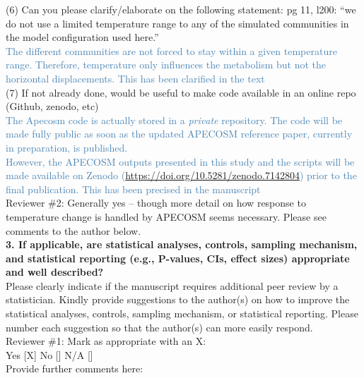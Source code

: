 \documentclass[12pt]{article}
\newcommand{\resp}[1]{\textcolor{SteelBlue}{#1}}
\begin{document}
(6) Can you please clarify/elaborate on the following statement: pg 11, l200: “we do not use a limited temperature range to any of the simulated communities in the model configuration used here.” \\


\resp{The different communities are not forced to stay within a given temperature range. Therefore, temperature
only influences the metabolism but not the horizontal displacements. This has been clarified in the text} \\

(7) If not already done, would be useful to make code available in an online repo (Github, zenodo, etc) \\ 

\resp{The Apecosm code is actually stored in a \emph{private} repository. The code will be made fully public as soon as the updated APECOSM reference paper, currently in preparation, is published.} \\

\resp{However, the APECOSM outputs presented in this study and the scripts will be made available on Zenodo (\url{https://doi.org/10.5281/zenodo.7142804}) prior to the final publication. This has been precised in the manuscript} \\

Reviewer \#2: Generally yes -- though more detail on how response to temperature change is handled by APECOSM seems necessary. Please see comments to the author below. \\

\textbf{3. If applicable, are statistical analyses, controls, sampling mechanism, and statistical reporting (e.g., P-values, CIs, effect sizes) appropriate and well described?} \\

Please clearly indicate if the manuscript requires additional peer review by a statistician. Kindly provide suggestions to the author(s) on how to improve the statistical analyses, controls, sampling mechanism, or statistical reporting. Please number each suggestion so that the author(s) can more easily respond.\\

Reviewer \#1: Mark as appropriate with an X:\\
Yes [X] No [] N/A []\\
Provide further comments here:\\
\end{document}
